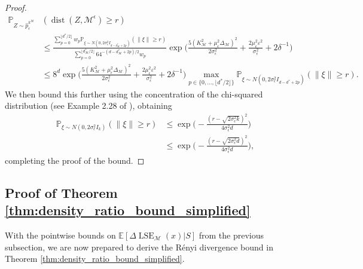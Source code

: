 \documentclass[10pt]{article}
\theoremstyle{plain}
\theoremstyle{definition}
\theoremstyle{remark}
\newcommand{\M}{{\mathcal{M}}}
\newcommand{\lse}{\operatorname{LSE}}
\newcommand{\E}{\mathbb{E}}
\newcommand{\prob}{\mathbb{P}}
\newcommand{\dist}{\operatorname{dist}}
\newcommand{\gap}{\Delta_\M}
\begin{document}
\begin{proof}
\begin{align*}
    \prob_{Z \sim \hat{p}_\epsilon^{k^\M}}&(\dist(Z, \M^\epsilon) \geq r)\\
    &\leq \frac{\sum_{p=0}^{\lfloor d^*/2 \rfloor} w_p \prob_{\xi \sim N(0, 2\sigma_\epsilon^2I_{d-d_\M^*+2p})}(\|\xi\| \geq r) }{\sum_{p=0}^{\lfloor d_\M^*/2 \rfloor} 64^{-(d-d_\M^*+2p)/2} w_p} \exp \bigg ( \frac{5(K_\M^2 + \mu_\epsilon^2 \gap)^2}{2\sigma_\epsilon^2} + \frac{2\mu_\epsilon^2\varepsilon^2}{\sigma_\epsilon^2} + 2 \delta^{-1} \bigg )\\
    &\leq 8^d \exp \bigg ( \frac{5(K_\M^2 + \mu_\epsilon^2 \gap)^2}{2\sigma_\epsilon^2} + \frac{2\mu_\epsilon^2\varepsilon^2}{\sigma_\epsilon^2} + 2 \delta^{-1} \bigg ) \max_{p \in \{0, ..., \lfloor d^*/2 \rfloor\}} \prob_{\xi \sim N(0, 2\sigma_\epsilon^2I_{d-d^*+2p})}(\|\xi\| \geq r).
\end{align*}
We then bound this further using the concentration of the chi-squared distribution (see Example 2.28 of \citep{Wainwright2019-rz}), obtaining
\begin{align*}
    \prob_{\xi \sim N(0, 2\sigma_\epsilon^2I_k)}(\|\xi\| \geq r) &\leq \exp \bigg ( - \frac{(r-\sqrt{2\sigma_\epsilon^2 k})^2}{4 \sigma_\epsilon^2 d} \bigg )\\
    &\leq \exp \bigg ( - \frac{(r-\sqrt{2\sigma_\epsilon^2 d})^2}{4 \sigma_\epsilon^2 d} \bigg ),
\end{align*}
completing the proof of the bound.
\end{proof}

\subsection{Proof of Theorem \ref{thm:density_ratio_bound_simplified}}
With the pointwise bounds on $\E[\Delta \lse_\M(x)|S]$ from the previous subsection, we are now prepared to derive the R\'enyi divergence bound in Theorem \ref{thm:density_ratio_bound_simplified}.
\end{document}
